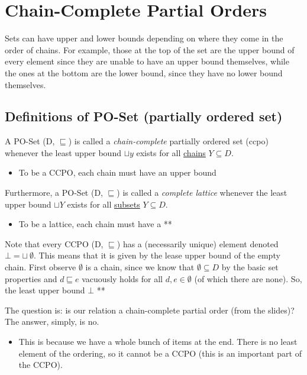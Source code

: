 \documentclass[11pt,a4paper,headsepline,titlepage,dvipsnames,cmyk]{scrartcl}
\begin{document}
\section{Chain-Complete Partial Orders}%
\label{sec:ccpo}

Sets can have upper and lower bounds depending on where they come in the
order of chains. For example, those at the top of the set are the upper
bound of every element since they are unable to have an upper bound
themselves, while the ones at the bottom are the lower bound, since they
have no lower bound themselves.

\subsection{Definitions of PO-Set (partially ordered set)}%
\label{sub:Definitions of PO-Set}
A PO-Set (D, $\sqsubseteq$) is called a \textit{chain-complete} partially
ordered set (ccpo) whenever the least upper bound $\sqcup y$ exists for
all \underline{chains} $Y \subseteq D$.
\begin{itemize}
    \item To be a CCPO, each chain must have an upper bound
\end{itemize}

Furthermore, a PO-Set (D, $\sqsubseteq$) is called a \textit{complete
lattice} whenever the least upper bound $\sqcup Y$ exists for all
\underline{subsets} $Y\subseteq D$.
\begin{itemize}
    \item To be a lattice, each chain must have a ** %
\end{itemize}

Note that every CCPO (D, $\sqsubseteq$) has a (necessarily unique) element
denoted $\bot = \sqcup \ \emptyset$. This means that it is given by the
lease upper bound of the empty chain. First observe $\emptyset$ is a
chain, since we know that $\emptyset \subseteq D$ by the basic set
properties and $d \sqsubseteq e$ vacuously holds for all $d,e \in
\emptyset$ (of which there are none). So, the least upper bound $\bot$ **

The question is: is our relation a chain-complete partial order (from the
slides)? The answer, simply, is no.
\begin{itemize}
    \item This is because we have a whole bunch of items at the end. There
        is no least element of the ordering, so it cannot be a CCPO (this
        is an important part of the CCPO).
\end{itemize}
\end{document}
